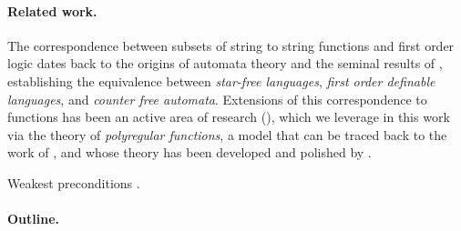 \paragraph{Related work.} The correspondence between subsets of string to
string functions and first order logic dates back to the origins of automata
theory and the seminal results of \cite{PEPI86,SCHU65,MNPA71}, establishing the
equivalence between \emph{star-free languages}, \emph{first order definable
languages}, and \emph{counter free automata}. Extensions of this correspondence
to functions has been an active area of research (\cite{CADA15,MUSC19}), which
we leverage in this work via the theory of \emph{polyregular functions}, a
model that can be traced back to the work of \cite{ENMA02}, and whose theory
has been developed and polished by \cite{bojanczyk2018polyregular}.

Weakest preconditions \cite[Chapter 7]{WINSKEL93}.


\paragraph{Outline.}



